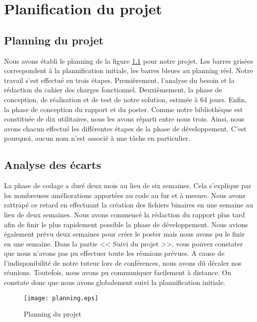 \chapter{Planification du projet}

\section{Planning du projet}

Nous avons \'etabli le planning de la figure \ref{fig:planning} pour notre projet. Les barres gris\'ees correspondent \`a la plannification initiale, les barres bleues au 
planning r\'eel.
\newline
Notre travail s'est effectu\'e en trois \'etapes. Premi\`erement, l'analyse du besoin et la r\'edaction du cahier des charges fonctionnel.
Deuxi\`emement, la phase de conception, de r\'ealisation et de test de notre solution, estim\'ee \`a 64 jours.
Enfin, la phase de conception du rapport et du poster.
Comme notre biblioth\`eque est constitu\'ee de dix utilitaires, nous les avons r\'eparti entre nous trois. Ainsi, nous avons chacun effectu\'e les diff\'erentes
\'etapes de la phase de d\'eveloppement. C'est pourquoi, aucun nom n'est associ\'e \`a une t\^ache en particulier.

\section{Analyse des \'ecarts}

La phase de codage a dur\'e deux mois au lieu de six semaines. Cela s'explique par les nombreuses am\'eliorations apport\'ees au code au fur et \`a mesure.
Nous avons rattrap\'e ce retard en effectuant la cr\'eation des fichiers binaires en une semaine au lieu de deux semaines.	 
Nous avons commenc\'e la r\'edaction du rapport plus tard afin de finir le plus rapidement possible la phase de d\'eveloppement.
Nous avions \'egalement pr\'evu deux semaines pour cr\'eer le poster mais nous avons pu le finir en une semaine.
\newline
Dans la partie << Suivi du projet >>, vous pouvez constater que nous n'avons pas pu effectuer toute les r\'eunions pr\'evues. A cause de l'indisponibilit\'e de notre
tuteur lors de conf\'erences, nous avons d\^u d\'ecaler nos r\'eunions. Toutefois, nous avons pu communiquer facilement \`a distance.
On constate donc que nous avons globalement suivi la plannification initiale.

\newpage
\begin{figure}[h]
\begin{minipage}[c]{0mm}
\texttt{[image: planning.eps]}
\end{minipage}
\caption{Planning du projet}
\label{fig:planning}
\end{figure}

